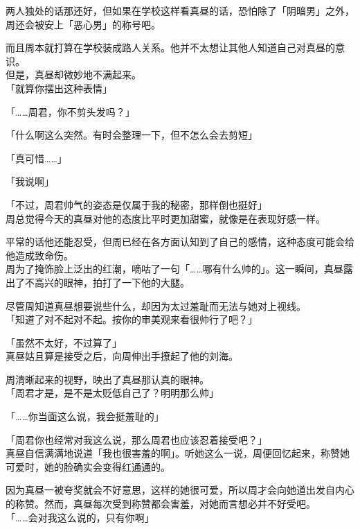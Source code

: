 两人独处的话那还好，但如果在学校这样看真昼的话，恐怕除了「阴暗男」之外，周还会被安上「恶心男」的称号吧。

而且周本就打算在学校装成路人关系。他并不太想让其他人知道自己对真昼的意识。\\

但是，真昼却微妙地不满起来。\\

「就算你摆出这种表情」

「……周君，你不剪头发吗？」

「什么啊这么突然。有时会整理一下，但不怎么会去剪短」

「真可惜……」

「我说啊」

「不过，周君帅气的姿态是仅属于我的秘密，那样倒也挺好」\\

周总觉得今天的真昼对他的态度比平时更加甜蜜，就像是在表现好感一样。

平常的话他还能忍受，但周已经在各方面认知到了自己的感情，这种态度可能会给他造成致命伤。\\

周为了掩饰脸上泛出的红潮，嘀咕了一句「……哪有什么帅的」。这一瞬间，真昼露出了不高兴的眼神，拍打了一下他的大腿。

尽管周知道真昼想要说些什么，却因为太过羞耻而无法与她对上视线。\\

「知道了对不起对不起。按你的审美观来看很帅行了吧？」

「虽然不太好，不过算了」\\

真昼姑且算是接受之后，向周伸出手撩起了他的刘海。

周清晰起来的视野，映出了真昼那认真的眼神。\\

「周君才是，是不是太贬低自己了？明明那么帅」

「……你当面这么说，我会挺羞耻的」

「周君你也经常对我这么说，那么周君也应该忍着接受吧？」\\

真昼自信满满地说道「我也很害羞的啊」。听她这么一说，周便回忆起来，称赞她可爱时，她的脸确实会变得红通通的。

因为真昼一被夸奖就会不好意思，这样的她很可爱，所以周才会向她道出发自内心的称赞。然而，真昼每次受到称赞都会害羞，对她而言想必并不好受吧。\\

「……会对我这么说的，只有你啊」

